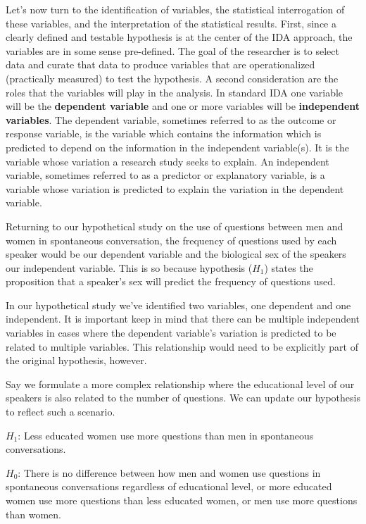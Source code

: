 \documentclass[
]{article}
\begin{document}
Let's now turn to the identification of variables, the statistical interrogation of these variables, and the interpretation of the statistical results. First, since a clearly defined and testable hypothesis is at the center of the IDA approach, the variables are in some sense pre-defined. The goal of the researcher is to select data and curate that data to produce variables that are operationalized (practically measured) to test the hypothesis. A second consideration are the roles that the variables will play in the analysis. In standard IDA one variable will be the \textbf{dependent variable} and one or more variables will be \textbf{independent variables}. The dependent variable, sometimes referred to as the outcome or response variable, is the variable which contains the information which is predicted to depend on the information in the independent variable(s). It is the variable whose variation a research study seeks to explain. An independent variable, sometimes referred to as a predictor or explanatory variable, is a variable whose variation is predicted to explain the variation in the dependent variable.

Returning to our hypothetical study on the use of questions between men and women in spontaneous conversation, the frequency of questions used by each speaker would be our dependent variable and the biological sex of the speakers our independent variable. This is so because hypothesis (\(H_1\)) states the proposition that a speaker's sex will predict the frequency of questions used.

In our hypothetical study we've identified two variables, one dependent and one independent. It is important keep in mind that there can be multiple independent variables in cases where the dependent variable's variation is predicted to be related to multiple variables. This relationship would need to be explicitly part of the original hypothesis, however.

Say we formulate a more complex relationship where the educational level of our speakers is also related to the number of questions. We can update our hypothesis to reflect such a scenario.

\(H_1\): Less educated women use more questions than men in spontaneous conversations.

\(H_0\): There is no difference between how men and women use questions in spontaneous conversations regardless of educational level, or more educated women use more questions than less educated women, or men use more questions than women.
\end{document}
